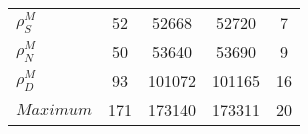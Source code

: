 \begin{center}
\begin{longtable}{lcccc}
$ {\rho^{M}_{S}}       $	 & 	                   52	 & 	                52668	 & 	                52720	 & 	                    7 \\ 
$ {\rho^{M}_{N}}       $	 & 	                   50	 & 	                53640	 & 	                53690	 & 	                    9 \\ 
$ {\rho^{M}_{D}}       $	 & 	                   93	 & 	               101072	 & 	               101165	 & 	                   16 \\ 
$Maximum               $	 & 	                  171	 & 	               173140	 & 	               173311	 & 	                   20 \\ 
\end{longtable}
 \end{center}
